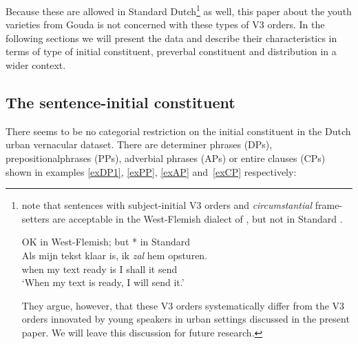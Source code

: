 \documentclass[output=paper]{langsci/langscibook}
\begin{document}
\noindent Because these are allowed in Standard
Dutch\footnote{\citet{GrecoHaegeman2020} note that sentences with
    subject-initial V3 orders and \emph{circumstantial} frame-setters are
    acceptable in the West-Flemish dialect of , but not in Standard .

\begin{exe}                   %
     OK in West-Flemish; but * in Standard \\
    \gll \llap{*}Als mijn tekst klaar is, ik \textit{zal} hem opsturen.\\
    when my text ready is I shall it send\\
    \trans \enquote*{When my text is ready, I will send it.}
\end{exe}                   %

They argue, however, that these V3 orders systematically differ from the V3
orders innovated by young  speakers in urban settings discussed in the
present paper. We will leave this discussion for future research.} as well,
this paper about the  youth varieties from Gouda is not concerned with
these types of V3 orders. In the following sections we will present the data
and describe their characteristics in terms of type of initial constituent,
preverbal constituent and distribution in a wider context.

\subsection{The sentence-initial constituent}
\label{sec:dataic}

There seems to be no categorial restriction on the initial constituent in the
Dutch urban vernacular dataset. There are determiner phrases (DPs),
prepositional\linebreak phrases (PPs), adverbial phrases (APs) or entire clauses (CPs)
shown in examples \eqref{exDP1}, \eqref{exPP}, \eqref{exAP} and~\eqref{exCP}
respectively:
\end{document}
